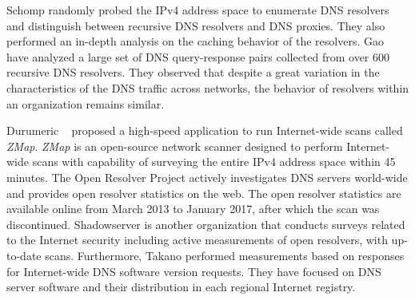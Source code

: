 Schomp \etal  randomly probed the IPv4 address space to enumerate DNS resolvers and distinguish between recursive DNS resolvers and DNS proxies. They also performed an in-depth analysis on the caching behavior of the resolvers. Gao \etal~ have analyzed a large set of DNS query-response pairs collected from over 600 recursive DNS resolvers. They observed that despite a great variation in the characteristics of the DNS traffic across networks, the behavior of resolvers within an organization remains similar.

Durumeric \etal~ proposed a high-speed application to run Internet-wide scans called {\em ZMap}. {\em ZMap} is an open-source network scanner designed to perform Internet-wide scans with capability of surveying the entire IPv4 address space within 45 minutes. The Open Resolver Project  actively investigates DNS servers world-wide and provides open resolver statistics on the web. The open resolver statistics are available online from March 2013 to January 2017, after which the scan was discontinued. Shadowserver  is another organization that conducts surveys related to the Internet security including active measurements of open resolvers, with up-to-date scans. Furthermore, Takano \etal  performed measurements based on responses for Internet-wide DNS software version requests. They have focused on DNS server software and their distribution in each regional Internet registry.

